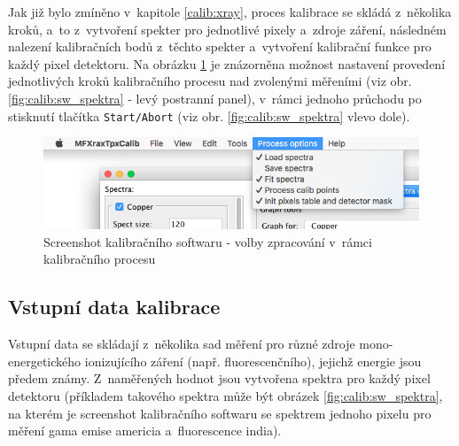 Jak již bylo zmíněno v~kapitole \ref{calib:xray}, proces kalibrace se skládá z~několika kroků, a~to z~vytvoření spekter pro jednotlivé pixely a~zdroje záření, následném nalezení kalibračních bodů z~těchto spekter a~vytvoření kalibrační funkce pro každý pixel detektoru. Na obrázku \ref{fig:calib:sw_process_ops} je znázorněna možnost nastavení provedení jednotlivých kroků kalibračního procesu nad zvolenými měřeními (viz obr. \ref{fig:calib:sw_spektra} - levý postranní panel), v~rámci jednoho průchodu po stisknutí tlačítka \texttt{Start/Abort} (viz obr. \ref{fig:calib:sw_spektra} vlevo dole).

\begin{figure}[th]
	\begin{center}
		\includegraphics[width=14cm]{figures/calibsw_process_ops.png}
		\caption{Screenshot kalibračního softwaru - volby zpracování v~rámci kalibračního procesu}
		\label{fig:calib:sw_process_ops}
	\end{center}
\end{figure}


\subsection{Vstupní data kalibrace}
Vstupní data se skládají z~několika sad měření pro různé zdroje mono-energetického ionizujícího záření (např. fluorescenčního), jejichž energie jsou předem známy. Z~naměřených hodnot jsou vytvořena spektra pro každý pixel detektoru (příkladem takového spektra může být obrázek \ref{fig:calib:sw_spektra}, na kterém je screenshot kalibračního softwaru se spektrem jednoho pixelu pro měření gama emise americia a~fluorescence india).

